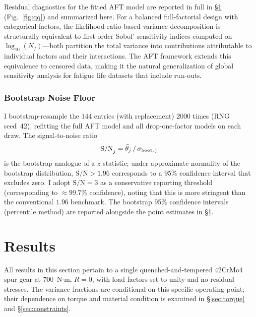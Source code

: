 \documentclass[twocolumn,12pt,a4paper]{article}
\begin{document}
Residual diagnostics for the fitted AFT model are reported in
full in \S\ref{sec:results} (Fig.~\ref{fig:qq}) and summarized
here. For a balanced full-factorial
design with categorical factors, the likelihood-ratio-based variance
decomposition is structurally equivalent to first-order Sobol'
sensitivity indices computed on $\log_{10}(N_f)$---both partition the
total variance into contributions attributable to individual factors
and their interactions. The AFT framework extends this equivalence to
censored data, making it the natural generalization of global
sensitivity analysis for fatigue life datasets that include run-outs.

\subsubsection{Bootstrap Noise Floor}

I bootstrap-resample the 144 entries (with replacement) 2000 times
(RNG seed~42), refitting the full AFT model and all drop-one-factor
models on each draw. The signal-to-noise ratio
\begin{equation}
\mathrm{S/N}_j = \bar{\theta}_j \,/\, \sigma_{\rm boot,\,j}
\label{eq:snr}
\end{equation}
is the
bootstrap analogue of a $z$-statistic; under approximate normality
of the bootstrap distribution, $\mathrm{S/N} > 1.96$ corresponds to
a 95\% confidence interval that excludes zero. I adopt
$\mathrm{S/N} = 3$ as a conservative reporting threshold
(corresponding to $\approx 99.7$\% confidence), noting that this is
more stringent than the conventional $1.96$ benchmark. The bootstrap
95\% confidence intervals (percentile method) are reported alongside
the point estimates in \S\ref{sec:results}.

\section{Results}
\label{sec:results}

All results in this section pertain to a single quenched-and-tempered
42CrMo4 spur gear at 700~N$\cdot$m, $R=0$, with load factors set to
unity and no residual stresses. The variance fractions are conditional
on this specific operating point; their dependence on torque and
material condition is examined in \S\ref{sec:torque} and
\S\ref{sec:constraints}.
\end{document}
